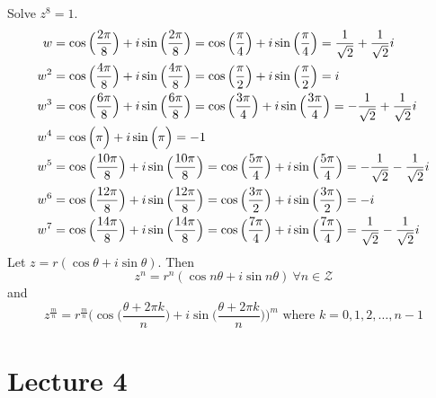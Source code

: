 \documentclass[12pt]{article}
\begin{document}
Solve $z^8 = 1$. $$ \begin{aligned} 
w &= \cosisin{\frac{2\pi}{8}} = \cosisin{\frac{\pi}{4}} = \frac{1}{\sqrt{2}} + \frac{1}{\sqrt{2}}i \\ 
w^2 &= \cosisin{\frac{4\pi}{8}} = \cosisin{\frac{\pi}{2}} = i \\ 
w^3 &= \cosisin{\frac{6\pi}{8}} = \cosisin{\frac{3\pi}{4}} = -\frac{1}{\sqrt{2}} + \frac{1}{\sqrt{2}}i \\
w^4 &= \cosisin{\pi} = -1 \\
w^5 &= \cosisin{\frac{10\pi}{8}} = \cosisin{\frac{5\pi}{4}} = -\frac{1}{\sqrt{2}} - \frac{1}{\sqrt{2}}i \\
w^6 &= \cosisin{\frac{12\pi}{8}} = \cosisin{\frac{3\pi}{2}} = -i \\
w^7 &= \cosisin{\frac{14\pi}{8}} = \cosisin{\frac{7\pi}{4}} = \frac{1}{\sqrt{2}} - \frac{1}{\sqrt{2}}i \end{aligned} $$ 
Let $z = r(\cos\theta + i\sin\theta)$. Then $$z^n = r^n(\cos n\theta + i\sin n\theta) ~\forall n \in \mathcal{Z}$$ and $$z^{\frac{m}{n}} = r^{\frac{m}{n}}\Big( \cos\Big( \frac{\theta + 2\pi k}{n} \Big) + i\sin \Big( \frac{\theta + 2\pi k}{n} \Big)\Big)^m \text{ where } k = 0,1,2,\dots,n-1 $$ 

\section{Lecture 4} 
\end{document}
